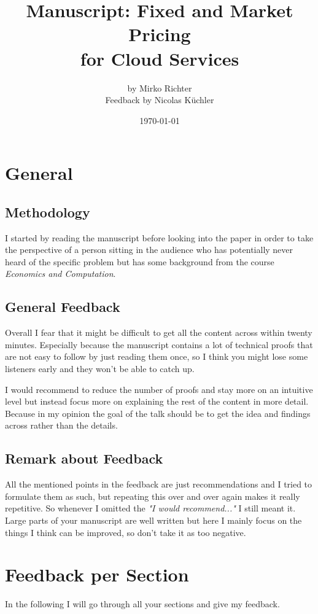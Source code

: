 \documentclass[]{article}
\title{Manuscript: Fixed and Market Pricing \\for Cloud Services}
\author{ by Mirko Richter \\ Feedback by Nicolas K\"uchler}
\date{\today}
\begin{document}
\maketitle

\section{General}
\subsection{Methodology}
I started by reading the manuscript before looking into the paper in order to take the perspective of a person sitting in the audience who has potentially never heard of the specific problem but has some background from the course \emph{Economics and Computation}.

\subsection{General Feedback}
Overall I fear that it might be difficult to get all the content across within twenty minutes. Especially because
the manuscript contains a lot of technical proofs that are not easy to follow by just reading them once, so I think you might lose some listeners early and they won't be able to catch up.

I would recommend to reduce the number of proofs and stay more on an intuitive level but instead focus more on explaining the rest of the content in more detail. Because in my opinion the goal of the talk should be to get the idea and findings across rather than the details.

\subsection{Remark about Feedback}
All the mentioned points in the feedback are just recommendations and I tried to formulate them as such, but repeating this over and over again makes it really repetitive. So whenever I omitted the \textit{"I would recommend..."} I still meant it. 
Large parts of your manuscript are well written but here I mainly focus on the things I think can be improved, so don't take it as too negative.

\section{Feedback per Section}
In the following I will go through all your sections and give my feedback.
\end{document}

